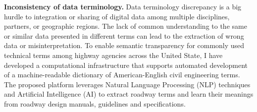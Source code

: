 \documentclass[a4paper,11pt]{article}
\begin{document}
\par
{\bf Inconsistency of data terminology.} Data terminology discrepancy is a big hurdle to integration or sharing of digital data among multiple disciplines, partners, or geographic regions. 
%
The lack of common understanding to the same or similar data presented in different terms can lead to the extraction of wrong data or misinterpretation. 
%
%
%
%
%
To enable semantic transparency for commonly used technical terms among highway agencies across the United State, I have developed a computational infrastructure that supports automated development of a machine-readable dictionary of American-English civil engineering terms. 
%
The proposed platform leverages Natural Language Processing (NLP) techniques and Artificial Intelligence (AI) to extract roadway terms and learn their meanings from roadway design manuals, guidelines and specifications.
\end{document}
